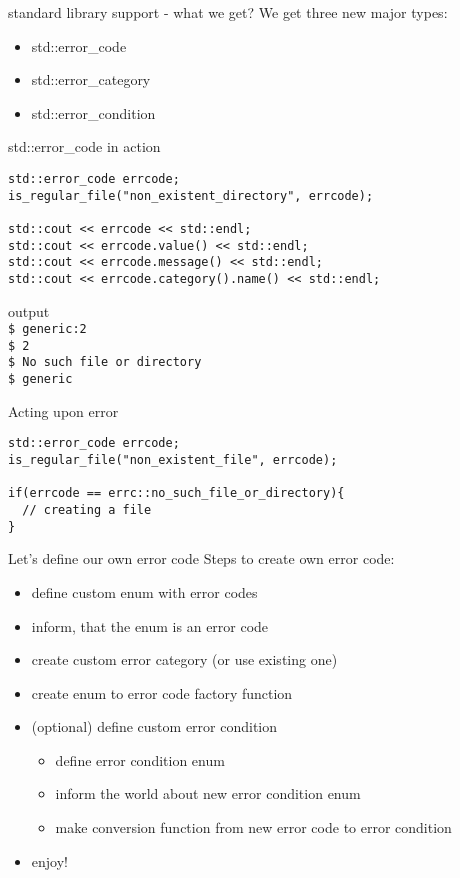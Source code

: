 \documentclass[10pt]{beamer}
\begin{document}
\begin{frame}{standard library support - what we get?}
	We get three new major types:
	\begin{itemize}
		\item std::error\_code
		\item std::error\_category
		\item std::error\_condition
	\end{itemize}
\end{frame}
	

\begin{frame}[fragile]{std::error\_code in action}
	\begin{verbatim}
std::error_code errcode;
is_regular_file("non_existent_directory", errcode);

std::cout << errcode << std::endl;
std::cout << errcode.value() << std::endl;
std::cout << errcode.message() << std::endl;
std::cout << errcode.category().name() << std::endl;
	\end{verbatim}
	
	\hrulefill
	
	\begin{block}{output}
	\texttt{\\
		\$ generic:2 \\
		\$ 2 \\
		\$ No such file or directory \\
		\$ generic}	
	\end{block}
	
\end{frame}

\begin{frame}[fragile]{Acting upon error}
	\begin{verbatim}
std::error_code errcode;
is_regular_file("non_existent_file", errcode);
  
if(errcode == errc::no_such_file_or_directory){
  // creating a file
}
	\end{verbatim}
\end{frame}

\begin{frame}{Let's define our own error code}
	Steps to create own error code:
	\begin{itemize}[<+- | alert@+>]
		\item define custom enum with error codes
		\item inform, that the enum is an error code
		\item create custom error category (or use existing one)
		\item create enum to error code factory function
		\item (optional) define custom error condition
		\begin{itemize}
			\item define error condition enum
			\item inform the world about new error condition enum
			\item make conversion function from new error code to error condition
		\end{itemize}
		\item enjoy!
	\end{itemize}
\end{frame}
\end{document}
